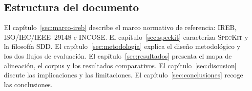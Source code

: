 \subsection{Estructura del documento}

El cap\'itulo~\ref{sec:marco-ireb} describe el marco normativo de referencia: IREB, ISO/IEC/IEEE~29148 e INCOSE. El cap\'itulo~\ref{sec:speckit} caracteriza \textsc{SpecKit} y la filosof\'ia SDD. El cap\'itulo~\ref{sec:metodologia} explica el dise\~no metodol\'ogico y los dos flujos de evaluaci\'on. El cap\'itulo~\ref{sec:resultados} presenta el mapa de alineaci\'on, el corpus y los resultados comparativos. El cap\'itulo~\ref{sec:discusion} discute las implicaciones y las limitaciones. El cap\'itulo~\ref{sec:conclusiones} recoge las conclusiones.
